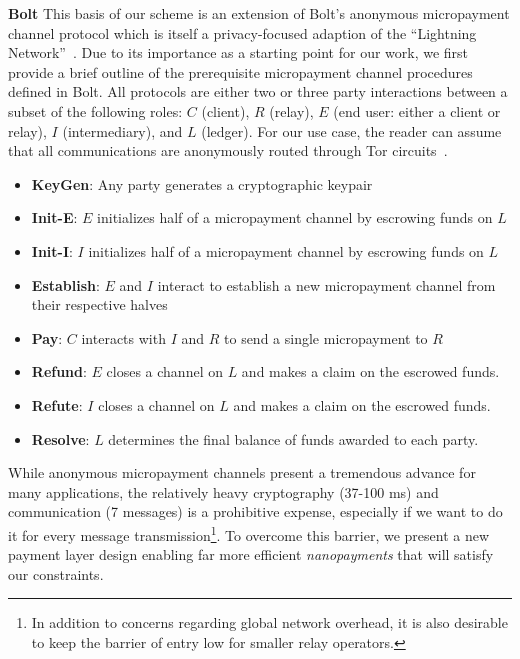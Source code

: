 \medskip
\noindent\textbf{Bolt} This basis of our scheme is an extension of Bolt's anonymous
micropayment channel protocol which is itself a privacy-focused adaption of the
``Lightning Network''~\cite{poon2016bitcoin}. Due to its importance as a
starting point for our work, we first provide a brief outline of the
prerequisite micropayment channel procedures defined in Bolt. All protocols are
either two or three party interactions between a subset of the following roles:
$C$ (client), $R$ (relay), $E$ (end user: either a client or relay), $I$
(intermediary), and $L$ (ledger). For our use case, the reader can assume that
all communications are anonymously routed through Tor
circuits~\cite{green2017bolt}.

\begin{itemize}
\item \textbf{KeyGen}: Any party generates a cryptographic keypair
\item \textbf{Init-E}: $E$ initializes half of a micropayment channel by
  escrowing funds on $L$
\item \textbf{Init-I}: $I$ initializes half of a micropayment channel by
  escrowing funds on $L$
\item \textbf{Establish}: $E$ and $I$ interact to establish a new micropayment
  channel from their respective halves
\item \textbf{Pay}: $C$ interacts with $I$ and $R$ to send a single micropayment to $R$
\item \textbf{Refund}: $E$ closes a channel on $L$ and makes a claim on
  the escrowed funds.
\item \textbf{Refute}: $I$ closes a channel on $L$ and makes a claim on
  the escrowed funds.
\item \textbf{Resolve}: $L$ determines the final balance of funds awarded to
  each party.
\end{itemize}

While anonymous micropayment channels present a tremendous advance for many
applications, the relatively heavy cryptography (37-100 ms) and communication
(7 messages) is a prohibitive expense, especially if we want to do it
for every message transmission\footnote{In
  addition to concerns regarding global network overhead, it is also desirable
  to keep the barrier of entry low for smaller relay operators.}. To overcome
this barrier, we present a new payment layer design enabling far more efficient
\emph{nanopayments} that will satisfy our constraints.


